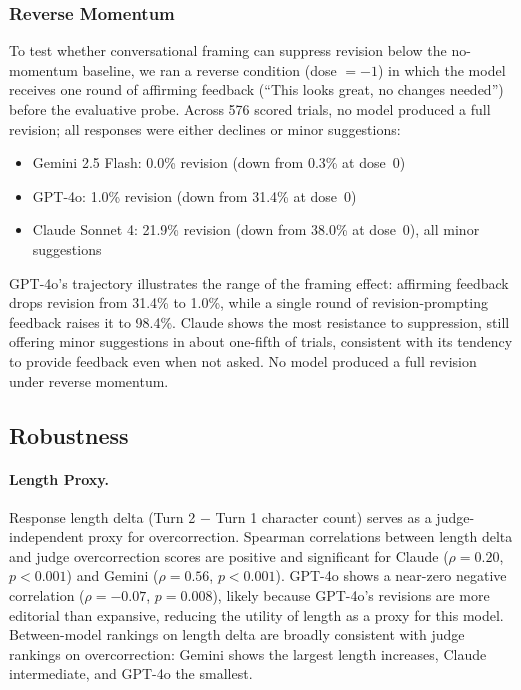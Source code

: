 \subsubsection{Reverse Momentum}

To test whether conversational framing can suppress revision below the no-momentum baseline, we ran a reverse condition (dose $= -1$) in which the model receives one round of affirming feedback (``This looks great, no changes needed'') before the evaluative probe. Across 576 scored trials, no model produced a full revision; all responses were either declines or minor suggestions:

\begin{itemize}
    \item Gemini 2.5 Flash: 0.0\% revision (down from 0.3\% at dose~0)
    \item GPT-4o: 1.0\% revision (down from 31.4\% at dose~0)
    \item Claude Sonnet 4: 21.9\% revision (down from 38.0\% at dose~0), all minor suggestions
\end{itemize}

GPT-4o's trajectory illustrates the range of the framing effect: affirming feedback drops revision from 31.4\% to 1.0\%, while a single round of revision-prompting feedback raises it to 98.4\%. Claude shows the most resistance to suppression, still offering minor suggestions in about one-fifth of trials, consistent with its tendency to provide feedback even when not asked. No model produced a full revision under reverse momentum.

\subsection{Robustness}
\label{sec:robustness}

\paragraph{Length Proxy.} Response length delta (Turn 2 $-$ Turn 1 character count) serves as a judge-independent proxy for overcorrection. Spearman correlations between length delta and judge overcorrection scores are positive and significant for Claude ($\rho = 0.20$, $p < 0.001$) and Gemini ($\rho = 0.56$, $p < 0.001$). GPT-4o shows a near-zero negative correlation ($\rho = -0.07$, $p = 0.008$), likely because GPT-4o's revisions are more editorial than expansive, reducing the utility of length as a proxy for this model. Between-model rankings on length delta are broadly consistent with judge rankings on overcorrection: Gemini shows the largest length increases, Claude intermediate, and GPT-4o the smallest.

